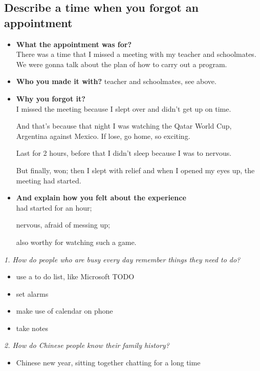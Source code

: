 \documentclass[conference]{IEEEtran}
\begin{document}
\subsection{Describe a time when you forgot an appointment}
\begin{itemize}
    \item \textbf{What the appointment was for?}\\
    There was a time that I missed a meeting with my teacher and schoolmates. 
    We were gonna talk about the plan of how to carry out a program.
    \item \textbf{Who you made it with?}
    teacher and schoolmates, see above.
    \item \textbf{Why you forgot it?}\\
    I missed the meeting because I slept over and didn't get up on time.

    And that's because that night I was watching the Qatar World Cup, Argentina against Mexico.
    If lose, go home, so exciting.

    Last for 2 hours, before that I didn't sleep because I was to nervous.

    But finally, won; then I slept with relief and when I opened my eyes up, the meeting had started.
    \item \textbf{And explain how you felt about the experience}\\
    had started for an hour;

    nervous, afraid of messing up;

    also worthy for watching such a game.
\end{itemize}

\textit{1. How do people who are busy every day remember things they need to do?}
\begin{itemize}
    \item use a to do list, like Microsoft TODO
    \item set alarms
    \item make use of calendar on phone
    \item take notes
\end{itemize}

\textit{2. How do Chinese people know their family history?}
\begin{itemize}
    \item Chinese new year, sitting together chatting for a long time
\end{itemize}
\end{document}
